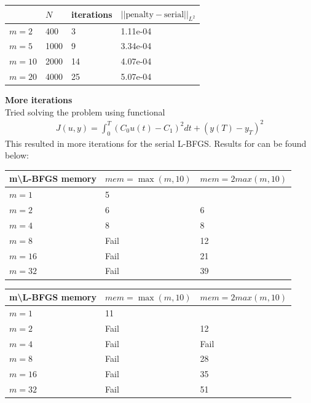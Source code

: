 \documentclass[11pt,a4paper]{report}
\begin{document}
\begin{center}
    \begin{tabular}{| l | l | l | l |}
    \hline
     & $N$ & iterations & $||\text{penalty}-\text{serial} ||_{L^2} $  \\ \hline
    $m=2$  &  400 & 3 & 1.11e-04  \\ \hline
    $m=5$  &  1000 &  9&	3.34e-04 \\ \hline
    $m=10$ &  2000 & 14&  4.07e-04\\ \hline
    $m=20$ &  4000 &  25	& 5.07e-04\\ \hline
	\end{tabular}
\end{center}  
\textbf{More iterations}
\\
Tried solving the problem using functional 
\begin{align*}
J(u,y)=\int_0^T (C_0u(t)-C_1)^2dt + (y(T)-y_T)^2
\end{align*}
This resulted in more iterations for the serial L-BFGS. Results for can be found below:
\begin{center}
    \begin{tabular}{| l | l | l |}
    \hline
    m\textbackslash L-BFGS memory & $mem =\max(m,10)$& $mem=2max(m,10)$\\ \hline
    $m=1$  &  5 &  \\ \hline
    $m=2$  &  6 &  6	\\ \hline
    $m=4$ &  8 & 8 \\ \hline
    $m=8$ &  Fail &  12	\\ \hline
    $m=16$ &  Fail & 21 \\ \hline
    $m=32$ &  Fail &  39	\\ \hline
    \end{tabular}
\end{center}
\begin{center}
    \begin{tabular}{| l | l | l |}
    \hline
    m\textbackslash L-BFGS memory & $mem =\max(m,10)$& $mem=2max(m,10)$\\ \hline
    $m=1$  &  11 &  \\ \hline
    $m=2$  &  Fail &  12	\\ \hline
    $m=4$ &  Fail & Fail \\ \hline
    $m=8$ &  Fail &  28	\\ \hline
    $m=16$ &  Fail & 35 \\ \hline
    $m=32$ &  Fail &  51	\\ \hline
    \end{tabular}
\end{center}
\end{document}
